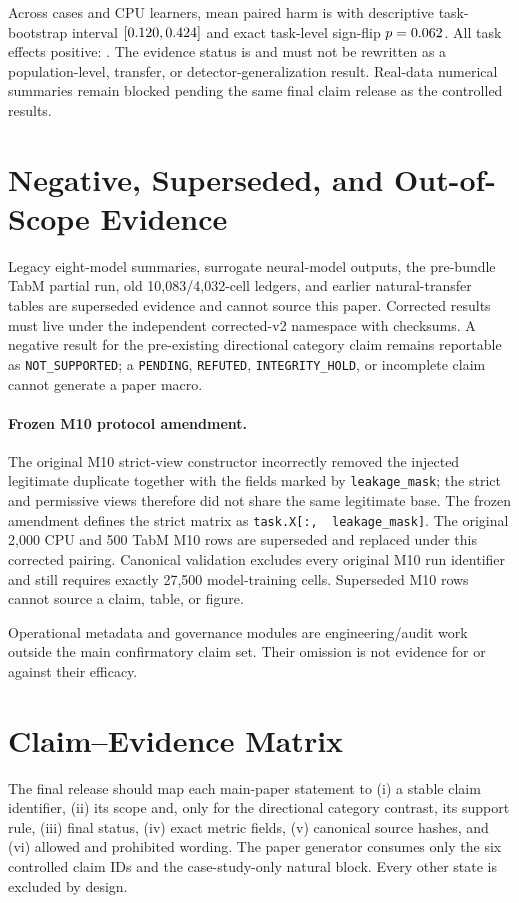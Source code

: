 \documentclass[letterpaper]{article}
\begin{document}
\ifLBResultsReady
Across \LBNaturalTaskCount{} cases and \LBNaturalModelCount{} CPU learners,
mean paired harm is \LBNaturalMeanHarm{} with descriptive task-bootstrap
interval $[0.120,0.424]$ and exact task-level sign-flip
$p=0.062$.  All task effects positive: \LBNaturalAllPositive{}.
The evidence status is \emph{\LBNaturalStatus{}} and must not be rewritten as a
population-level, transfer, or detector-generalization result.
\else
Real-data numerical summaries remain blocked pending the same final claim
release as the controlled results.
\fi

\section{Negative, Superseded, and Out-of-Scope Evidence}
Legacy eight-model summaries, surrogate neural-model outputs, the pre-bundle
TabM partial run, old 10,083/4,032-cell ledgers, and earlier natural-transfer
tables are superseded evidence and cannot source this paper.  Corrected results
must live under the independent corrected-v2 namespace with checksums.  A
negative result for the pre-existing directional category claim remains
reportable as \texttt{NOT\_SUPPORTED}; a
\texttt{PENDING}, \texttt{REFUTED}, \texttt{INTEGRITY\_HOLD}, or incomplete
claim cannot generate a paper macro.

\paragraph{Frozen M10 protocol amendment.}
The original M10 strict-view constructor incorrectly removed the injected
legitimate duplicate together with the fields marked by
\texttt{leakage\_mask}; the strict and permissive views therefore did not share
the same legitimate base.  The frozen amendment defines the strict matrix as
\texttt{task.X[:, \string~leakage\_mask]}.  The original 2,000 CPU and 500 TabM
M10 rows are superseded and replaced under this corrected pairing.  Canonical
validation excludes every original M10 run identifier and still requires
exactly 27,500 model-training cells.  Superseded M10 rows cannot source a claim,
table, or figure.

Operational metadata and governance modules are engineering/audit work outside
the main confirmatory claim set.  Their omission is not evidence for or against
their efficacy.

\section{Claim--Evidence Matrix}
The final release should map each main-paper statement to (i) a stable claim
identifier, (ii) its scope and, only for the directional category contrast, its
support rule, (iii) final status, (iv) exact
metric fields, (v) canonical source hashes, and (vi) allowed and prohibited
wording.  The paper generator consumes only the six controlled claim IDs and
the case-study-only natural block.  Every other state is excluded by design.
\end{document}
